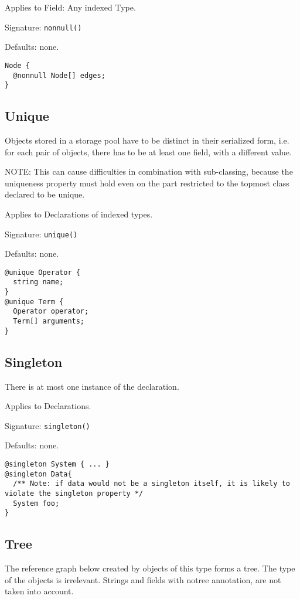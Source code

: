 \documentclass[a4paper,10pt]{article}
\begin{document}
Applies to Field: Any indexed Type.

Signature: \verb/nonnull()/

Defaults: none.

\begin{lstlisting}[label=nonnullExample,caption=Examples,language=skill]
Node {
  @nonnull Node[] edges;
}
\end{lstlisting}


\subsection*{Unique}
Objects stored in a storage pool have to be distinct in their serialized form, i.e. for each pair of objects, there has to be at least one field, with a different value.

NOTE: This can cause difficulties in combination with sub-classing, because the uniqueness property must hold even on the part restricted to the topmost class declared to be unique.

Applies to Declarations of indexed types.

Signature: \verb/unique()/

Defaults: none.

\begin{lstlisting}[label=uniqueExample,caption=Examples,language=skill]
@unique Operator {
  string name;
}
@unique Term {
  Operator operator;
  Term[] arguments;
}
\end{lstlisting}


\subsection*{Singleton}
There is at most one instance of the declaration.

Applies to Declarations.

Signature: \verb/singleton()/

Defaults: none.

\begin{lstlisting}[label=singletonExample,caption=Examples,language=skill]
@singleton System { ... }
@singleton Data{
  /** Note: if data would not be a singleton itself, it is likely to violate the singleton property */
  System foo;
}
\end{lstlisting}


\subsection*{Tree}
The reference graph below created by objects of this type forms a tree. The type of the objects is irrelevant. Strings and fields with notree annotation, are not taken into account.
\end{document}
